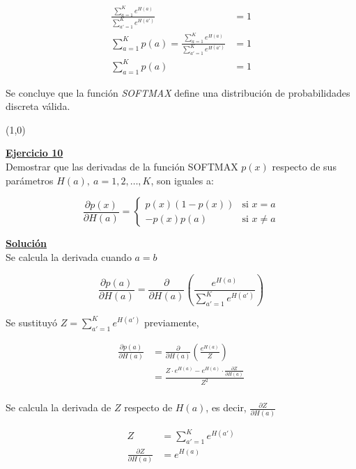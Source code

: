\documentclass[12pt]{article}
\newlength\tindent
\renewcommand{\indent}{\hspace*{\tindent}}
\begin{document}
\begin{itemize}
    \begin{align*}
        \frac{ \sum_{a=1}^{K} e^{H(a)} } {\sum_{a'=1}^{K} e^{H(a')}} &= 1 \\
        \sum_{a=1}^{K} p(a) = \frac{ \sum_{a=1}^{K} e^{H(a)} } {\sum_{a'=1}^{K} e^{H(a')}} &= 1\\
        \sum_{a=1}^{K} p(a) &= 1
    \end{align*}

    Se concluye que la función \textit{SOFTMAX} define una distribución de probabilidades discreta válida.

    \line(1,0){\textwidth}

    \indent\underline{\textbf{Ejercicio 10}}\\
    Demostrar que las derivadas de la función SOFTMAX $p(x)$ respecto de sus parámetros $H(a),\ a=1,2,\dots,K$, son iguales a:

    \[
        \frac{\partial p(x)}{\partial H(a)} =
        \begin{cases}
            p(x)(1-p(x))    &\text{si $x = a$} \\
            -p(x)p(a)       &\text{si $x\neq a$}
        \end{cases}
    \]

    \indent\underline{\textbf{Solución}}\\
    Se calcula la derivada cuando $a=b$

    \[
        \frac{\partial p(a)}{\partial H(a)} = \frac{\partial}{\partial H(a)} \left( \frac{e^{H(a)}}{\sum_{a'=1}^{K} e^{H(a')}} \right)
    \]

    Se sustituyó $Z=\sum_{a'=1}^{K} e^{H(a')}$ previamente,

    \begin{align*}
        \frac{\partial p(a)}{\partial H(a)} &= \frac{\partial}{\partial H(a)} \left( \frac{e^{H(a)}}{Z} \right) \\
        &= \frac{Z\cdot e^{H(a)} - e^{H(a)}\cdot \frac{\partial Z}{\partial H(a)}}{Z^2} \\
    \end{align*}

    Se calcula la derivada de $Z$ respecto de $H(a)$, es decir, $\frac{\partial Z}{\partial H(a)}$

    \begin{align*}
        Z &= \sum_{a'=1}^{K} e^{H(a')} \\
        \frac{\partial Z}{\partial H(a)} &= e^{H(a)}
    \end{align*}


\end{itemize}
\end{document}
